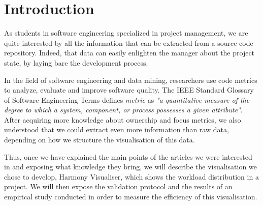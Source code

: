 \section{Introduction}

As students in software engineering specialized in project management, we are quite interested by all the information that can be extracted from a source code repository. Indeed, that data can easily enlighten the manager about the project state, by laying bare the development process. 

In the field of software engineering and data mining, researchers use code metrics to analyze, evaluate and improve software quality. The IEEE Standard Glossary of Software Engineering Terms defines \emph{metric} as \emph{"a quantitative measure of the degree to which a system, component, or process possesses a given attribute"}\cite{RSPressman}.\\
After acquiring more knowledge about ownership\cite{Girba2005,Girba2007} and focus\cite{Posnett} metrics, we also understood that we could extract even more information than raw data, depending on how we structure the visualisation of this data.

Thus, once we have explained the main points of the articles we were interested in and exposing what knowledge they bring, we will describe the visualisation we chose to develop, Harmony Visualiser, which shows the workload distribution in a project.
We will then expose the validation protocol and the results of an empirical study conducted in order to measure the efficiency of this visualisation.